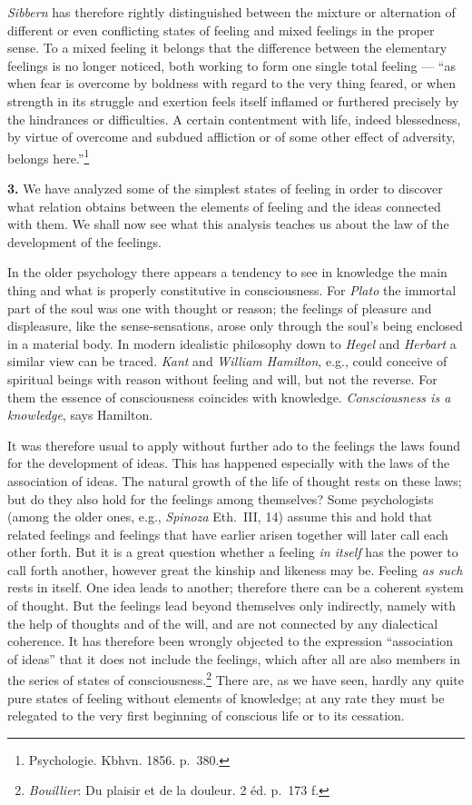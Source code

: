 \documentclass[12pt,a4paper]{book}
\newcommand{\opage}[1]{\marginnote{\footnotesize\textit{[#1]}}}
\begin{document}
\emph{Sibbern} has therefore rightly distinguished between the mixture
or alternation of different or even conflicting states of feeling and
mixed feelings in the proper sense. To a mixed feeling it belongs that
the difference between the elementary feelings is no longer noticed,
both working to form one single total feeling --- ``as when fear is
overcome by boldness with regard to the very thing feared, or when
strength in its struggle and exertion feels itself inflamed or furthered
precisely by the hindrances or difficulties. A certain contentment with
life, indeed blessedness, by virtue of overcome and subdued affliction
or of some other effect of adversity, belongs here.''\footnote{Psychologie.
Kbhvn. 1856. p.~380.}

\textbf{3.} We have analyzed some of the simplest states of feeling in
order to discover what relation obtains between the elements of feeling
and the ideas connected with them. We shall now see what this analysis
teaches us about the law of the development of the feelings.

In the older psychology there appears a tendency to see in knowledge the
main thing and what is properly constitutive in consciousness. For
\emph{Plato} the immortal part of the soul was one with thought or
reason; the feelings of pleasure and displeasure, like the
sense-sensations, arose only through the soul's being enclosed in a
material body. In modern idealistic philosophy down to \emph{Hegel} and
\emph{Herbart} a similar view can be traced. \emph{Kant} and
\emph{William Hamilton}, e.g., could conceive of spiritual beings with
reason without feeling and will, but not the reverse. For them the
essence of consciousness coincides with knowledge. \textit{Consciousness
is a knowledge}, says Hamilton.

It was therefore usual to apply without further ado to the feelings the
laws found for the development of ideas. This has happened especially
with the laws of the association of ideas. The natural growth of the
life of thought rests on these laws; but do they also hold for the
feelings among themselves? Some psychologists (among the older ones,
e.g., \emph{Spinoza} Eth.\ III, 14) assume this and hold that related
feelings and
\opage{289}feelings that have earlier arisen together will later call
each other forth. But it is a great question whether a feeling \emph{in
itself} has the power to call forth another, however great the kinship
and likeness may be. Feeling \emph{as such} rests in itself. One idea
leads to another; therefore there can be a coherent system of thought.
But the feelings lead beyond themselves only indirectly, namely with the
help of thoughts and of the will, and are not connected by any
dialectical coherence. It has therefore been wrongly objected to the
expression ``association of ideas'' that it does not include the
feelings, which after all are also members in the
series of states of consciousness.\footnote{\emph{Bouillier}: Du
plaisir et de la douleur. 2 éd. p.~173 f.} There are, as we have seen,
hardly any quite pure states of feeling without elements of knowledge;
at any rate they must be relegated to the very first beginning of
conscious life or to its cessation.
\end{document}
